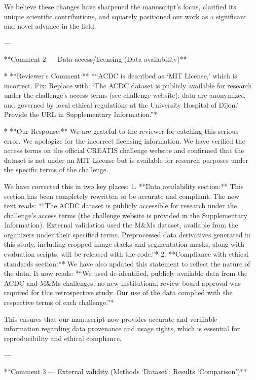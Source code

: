     We believe these changes have sharpened the manuscript’s focus, clarified its unique scientific contributions, and squarely positioned our work as a significant and novel advance in the field.

---

**Comment 2 — Data access/licensing (Data availability)**

*   **Reviewer’s Comment:** *“ACDC is described as ‘MIT License,’ which is incorrect. Fix: Replace with: ‘The ACDC dataset is publicly available for research under the challenge’s access terms (see challenge website); data are anonymized and governed by local ethical regulations at the University Hospital of Dijon.’ Provide the URL in Supplementary Information.”*

*   **Our Response:** We are grateful to the reviewer for catching this serious error. We apologize for the incorrect licensing information. We have verified the access terms on the official CREATIS challenge website and confirmed that the dataset is not under an MIT License but is available for research purposes under the specific terms of the challenge.

    We have corrected this in two key places:
    1.  **Data availability section:** This section has been completely rewritten to be accurate and compliant. The new text reads: *“The ACDC dataset is publicly accessible for research under the challenge’s access terms (the challenge website is provided in the Supplementary Information). External validation used the M\&Ms dataset, available from the organizers under their specified terms. Preprocessed data derivatives generated in this study, including cropped image stacks and segmentation masks, along with evaluation scripts, will be released with the code.”*
    2.  **Compliance with ethical standards section:** We have also updated this statement to reflect the nature of the data. It now reads: *“We used de-identified, publicly available data from the ACDC and M\&Ms challenges; no new institutional review board approval was required for this retrospective study. Our use of the data complied with the respective terms of each challenge.”*

    This ensures that our manuscript now provides accurate and verifiable information regarding data provenance and usage rights, which is essential for reproducibility and ethical compliance.

---

**Comment 3 — External validity (Methods ‘Dataset’; Results ‘Comparison’)**

